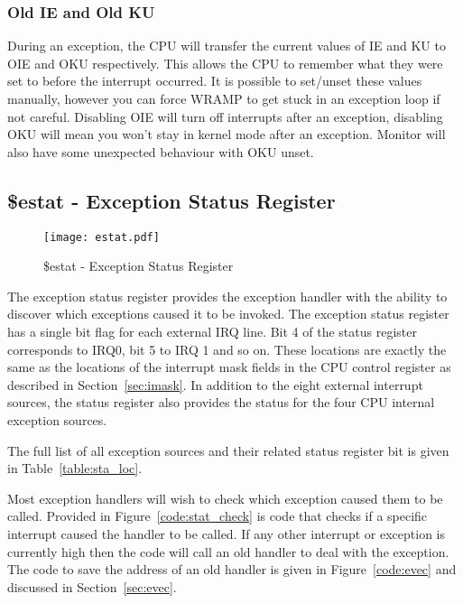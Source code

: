 \subsubsection{Old IE and Old KU}

During an exception, the CPU will transfer the current values of IE and KU
to OIE and OKU respectively. This allows the CPU to remember what they were
set to before the interrupt occurred. It is possible to set/unset these values
manually, however you can force WRAMP to get stuck in an exception loop if not
careful. Disabling OIE will turn off interrupts after an exception, disabling
OKU will mean you won't stay in kernel mode after an exception. Monitor will also
have some unexpected behaviour with OKU unset.

\subsection{\$estat - Exception Status Register}

\begin{figure}[h]
\begin{center}
\texttt{[image: estat.pdf]}
\caption{\$estat - Exception Status Register}
\label{estat_pic}
\end{center}
\end{figure}

The exception status register provides the exception handler with the
ability to discover which exceptions caused it to be invoked. The
exception status register has a single bit flag for each external IRQ
line. Bit 4 of the status register corresponds to IRQ0, bit 5 to IRQ 1
and so on. These locations are exactly the same as the locations of
the interrupt mask fields in the CPU control register as described in
Section~\ref{sec:imask}. In addition to the eight external interrupt
sources, the status register also provides the status for the four CPU
internal exception sources. 

The full list of all exception sources and their related status
register bit is given in Table~\ref{table:sta_loc}.

Most exception handlers will wish to check which exception caused them
to be called. Provided in Figure~\ref{code:stat_check} is code that
checks if a specific interrupt caused the handler to be called. If any
other interrupt or exception is currently high then the code will call
an old handler to deal with the exception. The code to save the
address of an old handler is given in Figure~\ref{code:evec} and
discussed in Section~\ref{sec:evec}.

